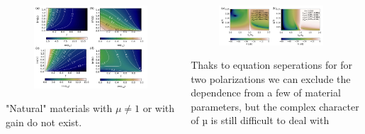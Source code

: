 \documentclass{beamer}
\begin{document}
\begin{frame} [t]
	\begin{columns}
		\begin{column}{0.5\textwidth}
			\begin{figure}
						\includegraphics[width=\textwidth]{../images/pml/oqe_materials.png}
			\end{figure}
			"Natural" materials with  $\mu \ne 1$ or with gain  do not exist.
		\end{column}
		\begin{column}{0.6\textwidth}
			\begin{figure}
						\includegraphics[width=0.9\textwidth]{../images/pml/oqe_reflection_kat.png}\\
			\end{figure}
				
		{\tiny Thaks to equation seperations for for two polarizations we can exclude the dependence from a few of material parameters, but the complex character of µ is still difficult to deal with}	


\end{column}
\end{columns}
\end{frame}
\end{document}
